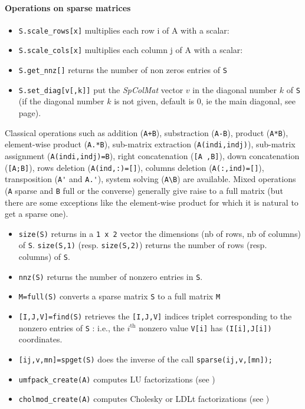 \paragraph{Operations on sparse matrices}
\begin{itemize}
\item \verb+S.scale_rows[x]+ multiplies each row i of A with a scalar:
\item \verb+S.scale_cols[x]+ multiplies each column j of A with a scalar:
\item \verb+S.get_nnz[]+ returns the number of non zeros entries of \verb+S+ 
\item \verb+S.set_diag[v[,k]]+ put the \emph{SpColMat} vector $v$ in the diagonal number $k$ of \verb+S+
 (if the diagonal number $k$ is not given, default is 0, ie the main diagonal, see  page).

\end{itemize}


Classical operations such as addition (\verb-A+B-), substraction  (\verb+A-B+), product (\verb+A*B+), 
element-wise product (\verb+A.*B+), sub-matrix extraction (\verb+A(indi,indj)+), 
sub-matrix assignment (\verb+A(indi,indj)=B+), right concatenation  (\verb+[A ,B]+), 
down concatenation  (\verb+[A;B]+),  rows deletion (\verb+A(ind,:)=[]+), columns deletion (\verb+A(:,ind)=[]+), 
transposition (\verb+A'+ and \verb+A.'+),  system solving (\verb+A\B+) are available. 
Mixed operations (\verb+A+ sparse and \verb+B+ full or the converse) generally give raise to a 
full matrix (but there are some exceptions like the element-wise product for which it is natural 
to get a sparse one). 

\begin{itemize}
   \item \verb+size(S)+ returns in a \verb+1 x 2+ vector the dimensions (nb of rows, nb of columns)
of \verb+S+. \verb+size(S,1)+ (resp. \verb+size(S,2)+) returns the number of rows 
(resp. columns) of \verb+S+.
    \item \verb+nnz(S)+ returns the number of nonzero entries in \verb+S+.
    \item \verb+M=full(S)+ converts a sparse matrix \verb+S+ to a full matrix \verb+M+ 
    \item \verb+[I,J,V]=find(S)+ retrieves the \verb+[I,J,V]+ indices triplet 
corresponding to the nonzero entries of \verb+S+ : i.e., the $i^{\mbox{th}}$ nonzero
value \verb+V[i]+ has \verb+(I[i],J[i])+ coordinates.
    \item \verb+[ij,v,mn]=spget(S)+ does the inverse of the call \verb+sparse(ij,v,[mn]);+ 
    \item \verb+umfpack_create(A)+ computes LU factorizations (see )
    \item \verb+cholmod_create(A)+ computes Cholesky or LDLt factorizations (see
      )
\end{itemize}

